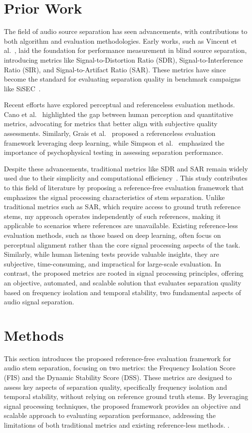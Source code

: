 \documentclass[10pt,twocolumn]{article}
\begin{document}
\section{Prior Work}

The field of audio source separation has seen advancements, with contributions to both algorithm and evaluation methodologies. Early works, such as Vincent et al.~\cite{vincent2006}, laid the foundation for performance measurement in blind source separation, introducing metrics like Signal-to-Distortion Ratio (SDR), Signal-to-Interference Ratio (SIR), and Signal-to-Artifact Ratio (SAR). These metrics have since become the standard for evaluating separation quality in benchmark campaigns like SiSEC~\cite{araki2011, stoter2018}.

Recent efforts have explored perceptual and referenceless evaluation methods. Cano et al.~\cite{cano2016} highlighted the gap between human perception and quantitative metrics, advocating for metrics that better align with subjective quality assessments. Similarly, Grais et al.~\cite{grais2018} proposed a referenceless evaluation framework leveraging deep learning, while Simpson et al.~\cite{simpson2017} emphasized the importance of psychophysical testing in assessing separation performance.

Despite these advancements, traditional metrics like SDR and SAR remain widely used due to their simplicity and computational efficiency~\cite{roux2019}. This study contributes to this field of literature by proposing a reference-free evaluation framework that emphasizes the signal processing characteristics of stem separation. Unlike traditional metrics such as SAR, which require access to ground truth reference stems, my approach operates independently of such references, making it applicable to scenarios where references are unavailable. Existing reference-less evaluation methods, such as those based on deep learning, often focus on perceptual alignment rather than the core signal processing aspects of the task. Similarly, while human listening tests provide valuable insights, they are subjective, time-consuming, and impractical for large-scale evaluation. In contrast, the proposed metrics are rooted in signal processing principles, offering an objective, automated, and scalable solution that evaluates separation quality based on frequency isolation and temporal stability, two fundamental aspects of audio signal separation.

\section{Methods}
This section introduces the proposed reference-free evaluation framework for audio stem separation, focusing on two metrics: the Frequency Isolation Score (FIS) and the Dynamic Stability Score (DSS). These metrics are designed to assess key aspects of separation quality, specifically frequency isolation and temporal stability, without relying on reference ground truth stems. By leveraging signal processing techniques, the proposed framework provides an objective and scalable approach to evaluating separation performance, addressing the limitations of both traditional metrics and existing reference-less methods. .
\end{document}
